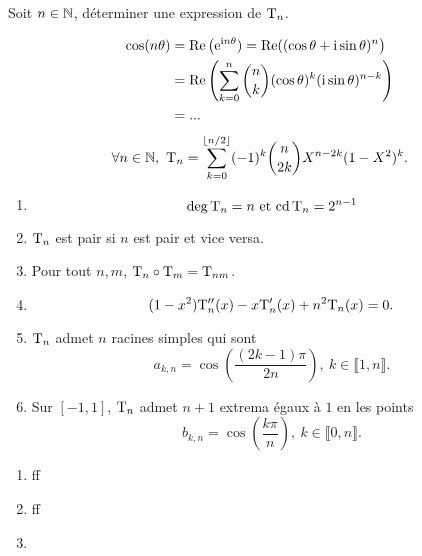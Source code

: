 
\begin{exercice}
    Soit $n \in \mathbb{N}$, déterminer une expression de $\mathrm{T}_n$.
\end{exercice}  

\begin{solution}
    \begin{align*}
        \cos(n \theta) &= \mathrm{Re} \left( \mathrm{e}^{\mathrm{i} n \theta}) = \mathrm{Re}((\cos \theta + \mathrm{i} \sin \theta)^n \right)\\
        &= \mathrm{Re}\left( \sum_{k=0}^n \binom{n}{k} (\cos\theta)^k (\mathrm{i} \sin\theta)^{n-k} \right) \\
        &= ...
    \end{align*}
    $$\forall n \in \N,\ \Tcheby_n = \sum_{k=0}^{\lfloor n / 2 \rfloor} (-1)^k \binom{n}{2k} X^{n-2k} (1-X^2)^k.$$
\end{solution}

\begin{prop}
    \begin{enumerate}
        \item $$\deg \mathrm{T}_n = n \text{ et } \mathrm{cd}\, \mathrm{T}_n = 2^{n-1}$$
        \item $\mathrm{T}_n$ est pair si $n$ est pair et vice versa. \\
        \item Pour tout $n, m$, $\mathrm{T}_n \circ \mathrm{T}_m = \mathrm{T}_{nm}$. \\
        \item $$(1-x^2) \mathrm{T}''_n(x) - x \mathrm{T}'_n(x) + n^2 \mathrm{T}_n(x) = 0.$$
        \item $\mathrm{T}_n$ admet $n$ racines simples qui sont
        $$a_{k,n} = \cos \left( \frac{(2k-1) \pi}{2n}\right),\ k \in \llbracket 1, n \rrbracket.$$
        \item Sur $[-1, 1]$, $\mathrm{T}_n$ admet $n+1$ extrema égaux à $1$ en les points
        $$b_{k,n} = \cos\left( \frac{k \pi}{n} \right),\ k \in \llbracket 0, n \rrbracket.$$
    \end{enumerate}
\end{prop}

\begin{preuve}
    \begin{enumerate}
        \item ff
        \item ff
        \item 
    \end{enumerate}
\end{preuve}

